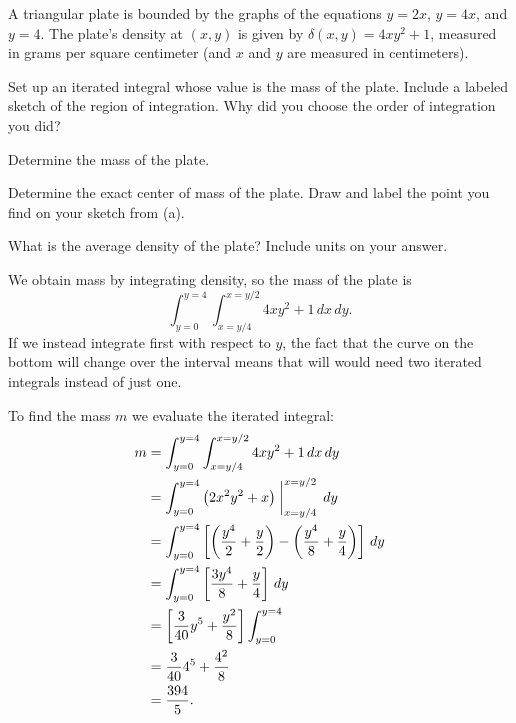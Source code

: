 \begin{exercises} 

\item A triangular plate is bounded by the graphs of the equations $y = 2x$, $y = 4x$, and $y = 4$.  The plate's density at $(x,y)$ is given by  $\delta(x,y) = 4xy^2 + 1$, measured in grams per square centimeter (and $x$ and $y$ are measured in centimeters).  
	
\ba
	\item Set up an iterated integral whose value is the mass of the plate. Include a labeled sketch of the region of integration.  Why did you choose the order of integration you did?  
	\item Determine the mass of the plate.    
	\item Determine the exact center of mass of the plate.  Draw and label the point you find on your sketch from (a).	
	\item  What is the average density of the plate?  Include units on your answer.
\ea

\begin{exerciseSolution}
\ba
	\item We obtain mass by integrating density, so the mass of the plate is
\[\int_{y=0}^{y=4} \int_{x=y/4}^{x=y/2} 4xy^2 + 1 \, dx \, dy.\]
If we instead integrate first with respect to $y$, the fact that the curve on the bottom will change over the interval means that will would need two iterated integrals instead of just one.   
	\item To find the mass $m$ we evaluate the iterated integral:
\begin{align*}
m&=\int_{y=0}^{y=4} \int_{x=y/4}^{x=y/2} 4xy^2 + 1 \, dx \, dy \\
	&= \int_{y=0}^{y=4} \left(2x^2y^2+x\right)\biggm|_{x=y/4}^{x=y/2} \, dy \\
	&= \int_{y=0}^{y=4} \left[\left(\frac{y^4}{2} + \frac{y}{2} \right) - \left(\frac{y^4}{8}+\frac{y}{4} \right)  \right] \, dy \\
	&= \int_{y=0}^{y=4} \left[\frac{3y^4}{8}+\frac{y}{4} \right] \, dy \\
	&= \left[\frac{3}{40}y^5 + \frac{y^2}{8} \right]  \int_{y=0}^{y=4}   \\
	&= \frac{3}{40}4^5 + \frac{4^2}{8}     \\
	&= \frac{394}{5}.
\end{align*}


\end{exerciseSolution}
\end{exercises}

